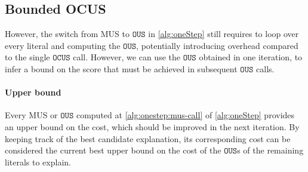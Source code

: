 \documentclass[twoside,11pt]{article}
\newcommand\m[1]{\mathcal{#1}}
\newcommand\comment[1]{\marginpar{\tiny #1}}
\renewcommand\comment[1]{#1}
\newcommand{\emilio}[1]{{\comment{\color{red}Emilio: #1}}}
\newcommand{\bart}[1]{{\comment{\color{OliveGreen}Bart: #1}}}
\newcommand\Iend{\ensuremath{I_\mathit{end} }\xspace}
\newcommand\formulac{\ensuremath{\m{C} }\xspace}
\newcommand\mm[1]{\ensuremath{#1}\xspace}
\newcommand\call[1]{\mm{\texttt{#1}}}
\newcommand\omus{\mm{\call{OUS}}}
\newcommand\comus{\mm{\call{OCUS}}}
\newcommand\onestepomus{\ensuremath{\call{Explain-One-Step-OUS}}\xspace}
\newcommand\onestepo{\ensuremath{\call{Explain-One-Step-OCUS}}\xspace}
\begin{document}
%



 
\subsection{Bounded OCUS}
However, the switch from MUS to \omus{} in \cref{alg:oneStep} still requires to loop over every literal and computing the \omus{}, potentially introducing overhead compared to the single \comus call. %
However, we can use the \omus{} obtained in one iteration, to infer a bound on the score that must be achieved in subsequent \omus{} calls.

\paragraph{Upper bound} Every MUS or \omus{} computed at \cref{alg:onestep:mus-call} of \cref{alg:oneStep} provides an upper bound on the cost, which should be improved in the next iteration. %
By keeping track of the best candidate explanation, its corresponding cost can be considered the current best upper bound on the cost of the \omus{}s of the remaining literals to explain.
\end{document}
